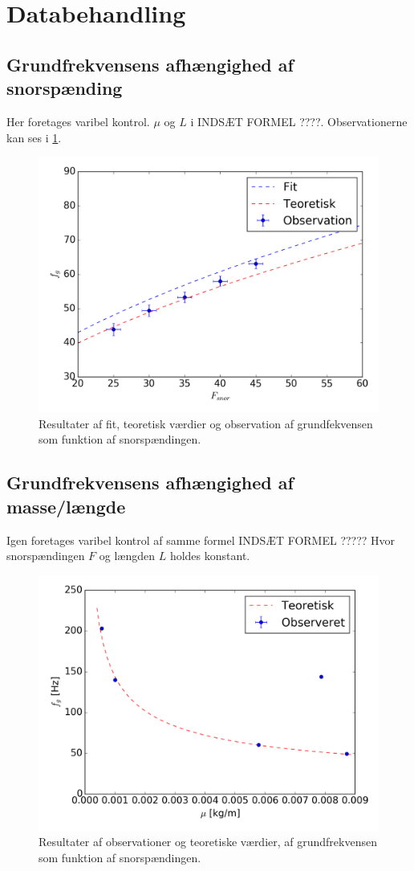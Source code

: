 \section{Databehandling}
\subsection{Grundfrekvensens afhængighed af snorspænding}
Her foretages varibel kontrol. $\mu$ og $L$ i INDSÆT FORMEL ????. Observationerne kan ses i \cref{fig:frekvensSNor}.
\begin{figure}[H]
    \includegraphics[width=\linewidth]{frekvensSnorSpaending.png}
    \caption{Resultater af fit, teoretisk værdier og observation af grundfekvensen som funktion af snorspændingen.}
    \label{fig:frekvensSNor}
\end{figure}

\subsection{Grundfrekvensens afhængighed af masse/længde}
Igen foretages varibel kontrol af samme formel INDSÆT FORMEL ????? Hvor snorspændingen $F$ og længden $L$ holdes konstant.
\begin{figure}[H]
    \includegraphics[width=\linewidth]{frekvensMu.png}
    \caption{Resultater af observationer og teoretiske værdier, af grundfrekvensen som funktion af snorspændingen.}
    \label{fig:frekvensMu}
\end{figure}

